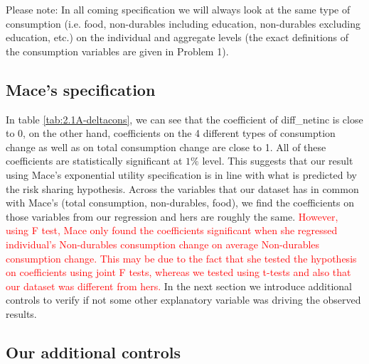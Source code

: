 \documentclass[12pt,a4paper]{article}
\begin{document}
Please note: In all coming specification we will always look at the same type of consumption (i.e. food, non-durables including education, non-durables excluding education, etc.) on the individual and aggregate levels (the exact definitions of the consumption variables are given in  Problem 1). 

\subsection*{Mace's specification}



In table \ref{tab:2.1A-deltacons}, we can see that the coefficient of diff\_netinc is close to 0, on the other hand, coefficients on the 4 different types of consumption change as well as on total consumption change are close to 1. All of these coefficients are statistically significant at $1\%$ level. This suggests that our result using Mace's exponential utility specification is in line with what is predicted by the risk sharing hypothesis. Across the variables that our dataset has in common with Mace's (total consumption, non-durables, food), we find the coefficients on those variables from our regression and hers are roughly the same. \textcolor{red}{However, using F test, Mace only found the coefficients significant when she regressed individual's Non-durables consumption change on average Non-durables consumption change. This may be due to the fact that she tested the hypothesis on coefficients using joint F tests, whereas we tested using t-tests and also that our dataset was different from hers.} In the next section we introduce additional controls to verify if not some other explanatory variable was driving the observed results.

\subsection*{Our additional controls} 
\end{document}
